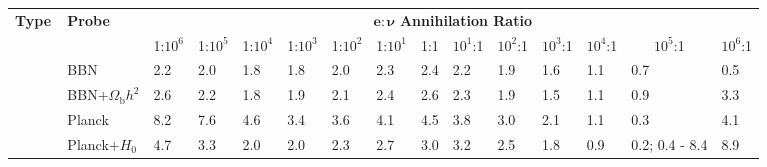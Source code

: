\documentclass[notitlepage,letterpaper,natbib,aps,prd,onecolumn,amsmath,amsfonts,nofootinbib,preprintnumbers,superscriptaddress,secnumarabic,groupedaddress]{revtex4-1}
\begin{document}
\begin{table}[t]
\begin{center}
{\def\arraystretch{1.3}
\begin{tabular}{c|l|p{0.7cm}|p{0.7cm}|p{0.7cm}|p{0.7cm}|p{0.7cm}|p{0.7cm}|p{0.7cm}|p{0.7cm}|p{0.7cm}|p{0.7cm}|p{0.7cm}|p{2cm}|p{0.7cm}}
\hline\hline
\multirow{2}{*}{\textbf{Type}$\,$} & \multirow{2}{*}{\vspace*{-0.1 cm}\hspace{0.44 cm}\textbf{Probe}} & \multicolumn{13}{c}{$\boldsymbol{e :}  \boldsymbol{\nu}$ \textbf{Annihilation Ratio}}\\
  &                       & \multicolumn{1}{c}{1:$10^6$} & \multicolumn{1}{c}{1:$10^5$} & \multicolumn{1}{c}{1:$10^4$} & \multicolumn{1}{c}{1:$10^3$} & \multicolumn{1}{c}{1:$10^2$} & \multicolumn{1}{c}{1:$10^1$} & \multicolumn{1}{c}{1:1} & \multicolumn{1}{c}{$10^1$:1} & \multicolumn{1}{c}{$10^2$:1} & \multicolumn{1}{c}{$10^3$:1} & \multicolumn{1}{c}{$10^4$:1} & \multicolumn{1}{c}{$10^5$:1} & \multicolumn{1}{c}{$10^6$:1} \\ \hline\hline
\parbox[t]{3mm}{} & BBN      & \hfil 2.2           &    \hfil 2.0        &  \hfil 1.8          & \hfil 1.8           & \hfil 2.0           &    \hfil 2.3        & \hfil 2.4     &  \hfil 2.2         &  \hfil 1.9           &  \hfil 1.6           &    \hfil 1.1         &  \hfil 0.7           & \hfil 0.5           \\
\rule{0pt}{3ex} & BBN+$\Omega_\mathrm{b}h^2$      & \hfil 2.6           &    \hfil 2.2        &   \hfil 1.8         & 
\hfil 1.9           & \hfil 2.1           &    \hfil 2.4        &  \hfil 2.6     &  \hfil 2.3          & \hfil 1.9           & \hfil 1.5           &    \hfil 1.1        & \hfil  0.9          &  \hfil 3.3          \\
\rule{0pt}{3ex} & Planck      &   \hfil 8.2         &    \hfil 7.6        &  \hfil 4.6          & \hfil  3.4          & \hfil 3.6           &   \hfil  4.1        & \hfil 4.5      &  \hfil 3.8       & \hfil 3.0           &   \hfil  2.1        &  \hfil 1.1          &  \hfil 0.3          & \hfil 4.1           \\
\rule{0pt}{3ex} & Planck$+H_0$      &  \hfil 4.7          &  \hfil 3.3          &     \hfil 2.0       &  \hfil   2.0        &   \hfil 2.3         & \hfil 2.7           & \hfil 3.0      & \hfil 3.2    &  \hfil 2.5      & \hfil  1.8          &     \hfil 0.9       &  \hfil 0.2; 0.4 - 8.4 &\hfil   8.9           \\

\end{tabular}}
\end{center}
\end{table}
\end{document}
